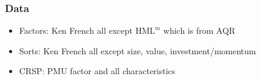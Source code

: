 \documentclass{beamer}
\begin{document}
\begin{frame}
\frametitle{Data}
\begin{itemize}
    \item Factors: Ken French all except $\text{HML}^m$ which is from AQR
    \item Sorts: Ken French all except size, value, investment/momentum
    \item CRSP: PMU factor and all characteristics
\end{itemize}
\end{frame}
\end{document}

